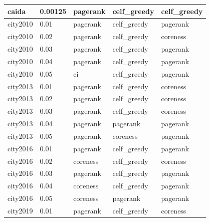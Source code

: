 \begin{longtable}[c]{|l|l|l|l|l|}
	caida            & 0.00125         & pagerank               & celf\_greedy           & celf\_greedy        \\ \hline
	city2010         & 0.01            & pagerank               & celf\_greedy           & pagerank            \\ \hline
	city2010         & 0.02            & pagerank               & celf\_greedy           & coreness            \\ \hline
	city2010         & 0.03            & pagerank               & celf\_greedy           & pagerank            \\ \hline
	city2010         & 0.04            & pagerank               & celf\_greedy           & pagerank            \\ \hline
	city2010         & 0.05            & ci                     & celf\_greedy           & pagerank            \\ \hline
	city2013         & 0.01            & pagerank               & celf\_greedy           & coreness            \\ \hline
	city2013         & 0.02            & pagerank               & celf\_greedy           & coreness            \\ \hline
	city2013         & 0.03            & pagerank               & celf\_greedy           & coreness            \\ \hline
	city2013         & 0.04            & pagerank               & pagerank               & pagerank            \\ \hline
	city2013         & 0.05            & pagerank               & coreness               & pagerank            \\ \hline
	city2016         & 0.01            & pagerank               & celf\_greedy           & pagerank            \\ \hline
	city2016         & 0.02            & coreness               & celf\_greedy           & coreness            \\ \hline
	city2016         & 0.03            & pagerank               & celf\_greedy           & pagerank            \\ \hline
	city2016         & 0.04            & coreness               & celf\_greedy           & pagerank            \\ \hline
	city2016         & 0.05            & coreness               & pagerank               & pagerank            \\ \hline
	city2019         & 0.01            & pagerank               & celf\_greedy           & coreness            \\ \hline

\end{longtable}

